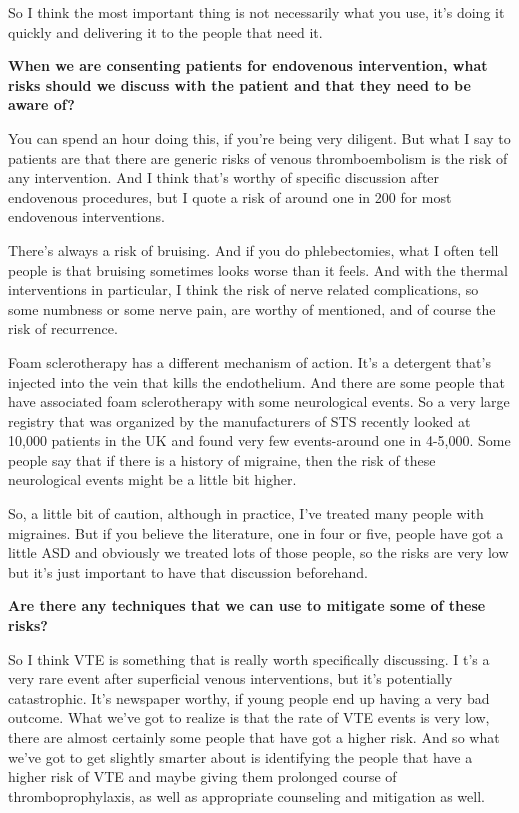 \documentclass[
]{book}
\begin{document}
So I think the most important thing is not necessarily what you use,
it's doing it quickly and delivering it to the people that need it.

\textbf{When we are consenting patients for endovenous intervention, what
risks should we discuss with the patient and that they need to be aware
of?}

You can spend an hour doing this, if you're being very diligent. But
what I say to patients are that there are generic risks of venous
thromboembolism is the risk of any intervention. And I think that's
worthy of specific discussion after endovenous procedures, but I quote a
risk of around one in 200 for most endovenous interventions.

There's always a risk of bruising. And if you do phlebectomies, what I
often tell people is that bruising sometimes looks worse than it feels.
And with the thermal interventions in particular, I think the risk of
nerve related complications, so some numbness or some nerve pain, are
worthy of mentioned, and of course the risk of recurrence.

Foam sclerotherapy has a different mechanism of action. It's a detergent
that's injected into the vein that kills the endothelium. And there are
some people that have associated foam sclerotherapy with some
neurological events. So a very large registry that was organized by the
manufacturers of STS recently looked at 10,000 patients in the UK and
found very few events-around one in 4-5,000. Some people say that if
there is a history of migraine, then the risk of these neurological
events might be a little bit higher.

So, a little bit of caution, although in practice, I've treated many
people with migraines. But if you believe the literature, one in four or
five, people have got a little ASD and obviously we treated lots of
those people, so the risks are very low but it's just important to have
that discussion beforehand.

\textbf{Are there any techniques that we can use to mitigate some of these
risks?}

So I think VTE is something that is really worth specifically
discussing. I t's a very rare event after superficial venous
interventions, but it's potentially catastrophic. It's newspaper worthy,
if young people end up having a very bad outcome. What we've got to
realize is that the rate of VTE events is very low, there are almost
certainly some people that have got a higher risk. And so what we've got
to get slightly smarter about is identifying the people that have a
higher risk of VTE and maybe giving them prolonged course of
thromboprophylaxis, as well as appropriate counseling and mitigation as
well.
\end{document}
